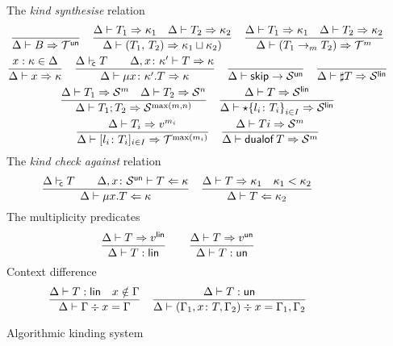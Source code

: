 \begin{figure}[h!]
  The \emph{kind synthesise} relation \hfill{}
  \begin{gather*}
    \frac{}{\algkindout{B}{\kindt^\un}}
    \quad 
    \frac{
      \algkindout{T_1}{\kind_1}
      \quad
      \algkindout{T_2}{\kind_2}
    }{
      \algkindout{\pairt{T_1}{T_2}}{\kind_1\join \kind_2)}
    }
    \quad
    \frac{
      \algkindout{T_1}{\kind_1}
      \quad
      \algkindout{T_2}{\kind_2}
    }{
      \algkindout{(\funt{T_1}{T_2})}{\kindt^m}
    }
    \\
    \frac{x : \kind \in \Delta}{\algkindout x \kind}
   \quad
  \frac{
    \isContr T
    \qquad
    \algkindout[\Delta, x\colon \kind'] T \kind
  }{
    \algkindout{\rect {x\colon \kind'} T}{\kind}
  }
  \quad
  \frac{}{\Delta \Alg \skipt \rightarrow \kinds^\un}
  \quad 
  \frac{}{\algkindout{\msgt T}{\kinds^\lin}}
  \\
  \frac{
    \algkindout{T_1}{\kinds^m}
    \quad
    \algkindout{T_2}{\kinds^n}
  }{
    \algkindout{\semit{T_1}{T_2}}{\kinds^{\max(m,n)}}
  }
  \quad
  \frac{
    \algkindout{T}{\kinds^\lin}
  }{
    \algkindout{\choicet{\{l_i\colon T_i\}}_{i\in I}}{\kinds^\lin}
  }
  \\
  \frac{
    \algkindout{T_i}{v^{m_i}}
  }{
    \algkindout{\datat{l_i\colon T_i}_{i\in I}}{\kindt^{\max(m_i)}}
  }  
  \quad
  \frac{
    \algkindout{Ti}{\kinds^m}
  }{
    \algkindout{\dualoft T}{\kinds^m}
  }
  \end{gather*}
  The \emph{kind check against} relation\hfill{}
  \begin{equation*}
    \frac{
      \isContr T
      \qquad
      \algkindin[\Delta, x\colon \kinds^\un] T \kind
    }{
      \algkindin{\rect xT}{\kind}
    }
    \quad
    \frac{
      \algkindout{T}{\kind_1}
      \quad
      \isSubkind{\kind_1}{\kind_2}
    }{
      \algkindin T {\kind_2}
    }
  \end{equation*}
  The multiplicity predicates \hfill{}\quad{}
  \begin{equation*}
    \frac{
      \algkindout T {v^\lin}
    }{
      \isLin T
    }
    \qquad
    \frac{
      \algkindout T {v^\un}
    }{
      \isUn T
    }
  \end{equation*}
  Context difference \hfill{}
  \begin{equation*}
    \frac{
      \isLin T
      \quad
      x\notin\Gamma
    }{
      \ctxdiff \Gamma x \Gamma
    }
    \quad
    \frac{
      \isUn T
    }{
      \ctxdiff {(\Gamma_1,x\colon T,\Gamma_2)} x {\Gamma_1,\Gamma_2}
    }
  \end{equation*}
  \caption{Algorithmic kinding system}
  \label{fig:kinding-system}
\end{figure}

